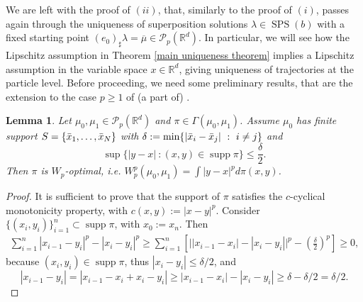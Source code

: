 \documentclass[10pt,leqno]{amsart}
\numberwithin{equation}{section}
\newtheorem{lemma}[teorema]{Lemma}
\newcommand{\R}{\mathbb{R}}
\newcommand{\PP}{\mathcal{P}}
\begin{document}
    We are left with the proof of $(ii)$, that, similarly to the proof of $(i)$, passes again through the uniqueness of superposition solutions $\lambda\in\operatorname{SPS}(b)$ with a fixed starting point $(e_0)_\sharp \lambda = \overline{\mu}\in \PP_p(\R^d)$. In particular, we will see how the Lipschitz assumption in Theorem \ref{main uniqueness theorem} implies a Lipschitz assumption in the variable space $x\in \R^d$, giving uniqueness of trajectories at the particle level. Before proceeding, we need some preliminary results, that are the extension to the case $p\geq 1$ of (a part of) \cite[Lemma 6.1, Theorem 6.2 and Theorem 7.6]{cavagnari2023lagrangian}. 

   

    \begin{lemma}
        Let $\mu_0,\mu_1\in \PP_p(\R^d)$ and $\pi \in \Gamma(\mu_0,\mu_1)$. Assume $\mu_0$ has finite support $S = \{\Bar{x}_1,\dots,\Bar{x}_N\}$ with $\delta:= \min\{|\Bar{x}_i - \Bar{x}_j| \ : \ i\neq j\}$ and 
        \[\sup\big\{ |y-x| \ : (x,y) \in \operatorname{supp}\pi \big\} \leq \frac{\delta}{2}.\]
        Then $\pi$ is $W_p$-optimal, i.e. $W_p^p(\mu_0,\mu_1) = \int |y-x|^pd\pi(x,y)$.
    \end{lemma}

    \begin{proof}
        It is sufficient to prove that the support of $\pi $ satisfies the $c$-cyclical monotonicity property, with $c(x,y) := |x-y|^p$. Consider $\{(x_i,y_i)\}_{i=1}^n \subset \operatorname{supp} 
        \pi$, with $x_0 := x_n$. Then
        \begin{align*}
            \sum_{i=1}^n |x_{i-1} - y_i|^p - |x_i-y_i|^p
            \geq \sum_{i=1}^n \left[\big||x_{i-1}-x_i| - |x_i-y_i|\big|^p - \left(\frac{\delta}{2}\right)^p\right]\geq 0,
        \end{align*}
        because $(x_i,y_i)\in \operatorname{supp}\pi$, thus $|x_i-y_i| \leq \delta/2$, and 
        \[|x_{i-1}- y_i| = |x_{i-1} -x_ i + x_i - y_i| \geq |x_{i-1} - x_i| - |x_i - y_i| \geq \delta - \delta/2 = \delta/2. \]
    \end{proof}
\end{document}
